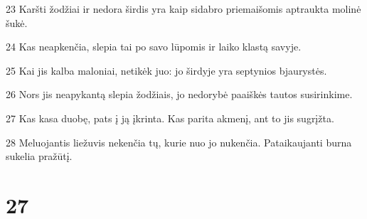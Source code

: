 \par 23 Karšti žodžiai ir nedora širdis yra kaip sidabro priemaišomis aptraukta molinė šukė. 
\par 24 Kas neapkenčia, slepia tai po savo lūpomis ir laiko klastą savyje. 
\par 25 Kai jis kalba maloniai, netikėk juo: jo širdyje yra septynios bjaurystės. 
\par 26 Nors jis neapykantą slepia žodžiais, jo nedorybė paaiškės tautos susirinkime. 
\par 27 Kas kasa duobę, pats į ją įkrinta. Kas parita akmenį, ant to jis sugrįžta. 
\par 28 Meluojantis liežuvis nekenčia tų, kurie nuo jo nukenčia. Pataikaujanti burna sukelia pražūtį.



\chapter{27}


